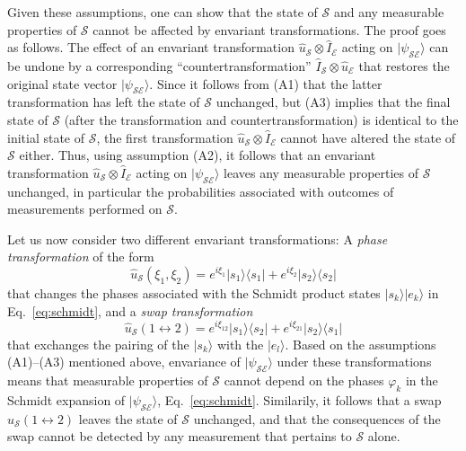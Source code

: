 \documentclass[twocolumn,rmp,aps,amsmath,amsfonts,noshowkeys,noshowpacs]{revtex4}
\newcommand{\ket}[1]{\ensuremath{|{#1\rangle}}}
\newcommand{\ketbra}[2]{\ensuremath{|{#1 \rangle}{\langle #2}|}}
\begin{document}
Given these assumptions, one can show that the state of $\mathcal{S}$
and any measurable properties of $\mathcal{S}$ cannot be affected by
envariant transformations. The proof goes as follows.  The effect of
an envariant transformation $\widehat{u}_\mathcal{S} \otimes
\widehat{I}_\mathcal{E}$ acting on $\ket{\psi_\mathcal{SE}}$ can be
undone by a corresponding ``countertransformation''
$\widehat{I}_\mathcal{S} \otimes \widehat{u}_\mathcal{E}$ that
restores the original state vector $\ket{\psi_\mathcal{SE}}$. Since it
follows from (A1) that the latter transformation has left the state of
$\mathcal{S}$ unchanged, but (A3) implies that the final state of
$\mathcal{S}$ (after the transformation and countertransformation) is
identical to the initial state of $\mathcal{S}$, the first
transformation $\widehat{u}_\mathcal{S} \otimes
\widehat{I}_\mathcal{E}$ cannot have altered the state of
$\mathcal{S}$ either. Thus, using assumption (A2), it follows that an
envariant transformation $\widehat{u}_\mathcal{S} \otimes
\widehat{I}_\mathcal{E}$ acting on $\ket{\psi_\mathcal{SE}}$ leaves
any measurable properties of $\mathcal{S}$ unchanged, in particular
the probabilities associated with outcomes of measurements performed
on $\mathcal{S}$.

Let us now consider two different envariant transformations: A \emph{phase
  transformation} of the form
%
\begin{equation} 
\widehat{u}_\mathcal{S}(\xi_1,\xi_2) = e^{i\xi_1} \ketbra{s_1}{s_1} + e^{i\xi_2} \ketbra{s_2}{s_2}
\end{equation}
%
that changes the phases associated with the Schmidt product states
$\ket{s_k}\ket{e_k}$ in Eq.~\eqref{eq:schmidt}, and a \emph{swap
  transformation}
%
\begin{equation} \label{eq:swap}
\widehat{u}_\mathcal{S}(1 \leftrightarrow 2) = e^{i\xi_{12}} \ketbra{s_1}{s_2} +
e^{i\xi_{21}} \ketbra{s_2}{s_1} 
\end{equation}
%
that exchanges the pairing of the $\ket{s_k}$ with the $\ket{e_l}$.
Based on the assumptions (A1)--(A3) mentioned above, envariance of
$\ket{\psi_\mathcal{SE}}$ under these transformations means that
measurable properties of $\mathcal{S}$ cannot depend on the phases
$\varphi_k$ in the Schmidt expansion of $\ket{\psi_\mathcal{SE}}$,
Eq.~\eqref{eq:schmidt}. Similarily, it follows that a swap
$\widehat{u}_\mathcal{S}(1 \leftrightarrow 2)$ leaves the state of
$\mathcal{S}$ unchanged, and that the consequences of the swap cannot
be detected by any measurement that pertains to $\mathcal{S}$ alone.
\end{document}
